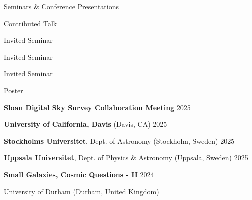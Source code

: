 \documentclass[cv.tex]{subfiles}
\begin{document}
\vspace{5mm}
\noindent
{\color{themecolor} \large Seminars \& Conference Presentations}
\vspace{1mm}
\par\noindent
\parbox{0.18\textwidth}{%
	\raggedleft
	Contributed Talk \par
	Invited Seminar \par
	Invited Seminar \par
	Invited Seminar \par
	Poster \par
	\null \par
}
\hspace{1mm}
\parbox{0.8\textwidth}{%
	\vspace{1mm}
	\textbf{Sloan Digital Sky Survey Collaboration Meeting} \hfill 2025 \par
	\textbf{University of California, Davis} (Davis, CA) \hfill 2025 \par
	\textbf{Stockholms Universitet}, Dept. of Astronomy (Stockholm, Sweden)
	\hfill 2025 \par
	\textbf{Uppsala Universitet}, Dept. of Physics \& Astronomy
	(Uppsala, Sweden) \hfill 2025 \par
	\textbf{Small Galaxies, Cosmic Questions - II} \hfill 2024 \par
	University of Durham (Durham, United Kingdom) \par
}
\end{document}
